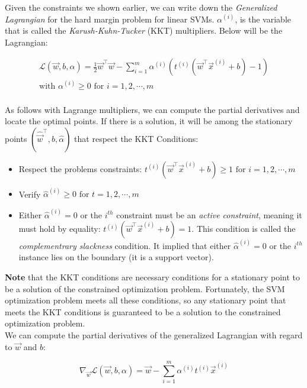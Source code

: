 \noindent
Given the constraints we shown earlier, we can write down the \textit{Generalized Lagrangian} for the hard margin
problem for linear SVMs. $\alpha^{(i)}$, is the variable that is called the \textit{Karush-Kuhn-Tucker} (KKT)
multipliers. Below will be the Lagrangian:

\[
\begin{aligned}
\mathcal{L}(\vec{w}, b, \alpha) = \frac{1}{2}\vec{w}^{\intercal}\vec{w} - \sum_{i=1}^{m} \alpha^{(i)}(t^{(i)}(\vec{w}^{\intercal}\vec{x}^{(i)} + b) - 1)\\
\textrm{with } \alpha^{(i)} \geq 0 \textrm{ for } i = 1, 2, \cdots, m
\end{aligned}
\]\\

\noindent
As follows with Lagrange multipliers, we can compute the partial derivatives and locate the optimal points. If
there is a solution, it will be among the stationary points $(\hat{\vec{w}}^{\intercal}, \hat{b}, \hat{\alpha})$ 
that respect the KKT Conditions:

\begin{itemize}
    \item Respect the problems constraints: $t^{(i)}(\vec{w}^{\intercal}\vec{x}^{(i)}+b) \geq 1 \textrm{ for } i = 1, 2, \cdots, m$
    \item Verify $\hat{\alpha}^{(i)} \geq 0 \textrm{ for } t = 1,2, \cdots, m$
    \item Either $\hat{\alpha}^{(i)} = 0$ or the $i^{th}$ constraint must be an \textit{active constraint}, meaning it
    must hold by equality: $t^{(i)}(\vec{w}^{\intercal}\vec{x}^{(i)}+b) = 1$. This condition is called the 
    \textit{complementrary slackness} condition. It implied that either $\hat{\alpha}^{(i)} = 0$ or the 
    $i^{th}$ instance lies on the boundary (it is a support vector).
\end{itemize}

\noindent 
\textbf{Note} that the KKT conditions are necessary conditions for a stationary point to be a solution of the 
constrained optimization problem. Fortunately, the SVM optimization problem meets all these conditions, so any
stationary point that meets the KKT conditions is guaranteed to be a solution to the constrained optimization 
problem.\\

\noindent
We can compute the partial derivatives of the generalized Lagrangian with regard to $\vec{w}$ and $b$:

$$\nabla_{\vec{w}} \mathcal{L}(\vec{w}, b, \alpha) = \vec{w} - \sum_{i=1}^{m} \alpha^{(i)}t^{(i)}\vec{x}^{(i)}$$

